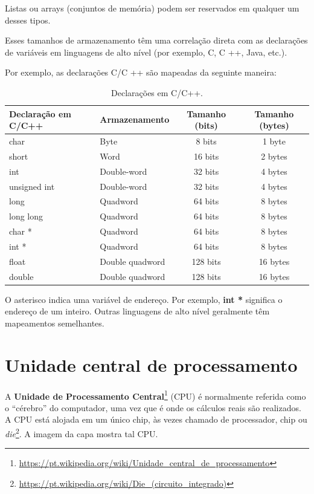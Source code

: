 Listas ou arrays (conjuntos de memória) podem ser reservados em qualquer um desses tipos.

Esses tamanhos de armazenamento têm uma correlação direta com as declarações de variáveis em linguagens de alto nível (por exemplo, C, C ++, Java, etc.).

Por exemplo, as declarações C/C ++ são mapeadas da seguinte maneira:
\begin{table}[h]
	\centering
	\begin{tabular}{|l|l|c|c|}
		\hline
		\rowcolor[HTML]{C0C0C0} 
		{\color[HTML]{000000} } Declaração em C/C++ & {\color[HTML]{000000} Armazenamento} & {\color[HTML]{000000} Tamanho (bits)} & {\color[HTML]{000000} Tamanho (bytes)} \\ \hline
		char & Byte& 8 bits & 1 byte\\ \hline
		short & Word & 16 bits & 2 bytes\\ \hline
		int & Double-word & 32 bits & 4 bytes\\ \hline
		unsigned int & Double-word & 32 bits & 4 bytes\\ \hline
		long\footnotemark & Quadword & 64 bits & 8 bytes\\ \hline
		long long  & Quadword & 64 bits & 8 bytes\\ \hline
		char *  & Quadword & 64 bits & 8 bytes\\ \hline
		int * & Quadword & 64 bits & 8 bytes\\ \hline
		float & Double quadword & 128 bits & 16 bytes  \\ \hline
		double & Double quadword & 128 bits & 16 bytes  \\ \hline
	\end{tabular}

	\caption{Declarações em C/C++.}
	\label{tab:declaracoesemC}
\end{table}

O asterisco indica uma variável de endereço. Por exemplo, \textbf{int *} significa o endereço de um inteiro. Outras linguagens de alto nível geralmente têm mapeamentos semelhantes.

\section{Unidade central de processamento}
A \textbf{Unidade de Processamento Central}\footnote{\url{https://pt.wikipedia.org/wiki/Unidade\_central\_de\_processamento}} (CPU) é normalmente referida como o ``cérebro'' do computador, uma vez que é onde os cálculos reais são realizados. A CPU está alojada em um único chip, às vezes chamado de processador, chip ou \textit{die}\footnote{\url{https://pt.wikipedia.org/wiki/Die\_(circuito\_integrado)}}. A imagem da capa mostra tal CPU.

